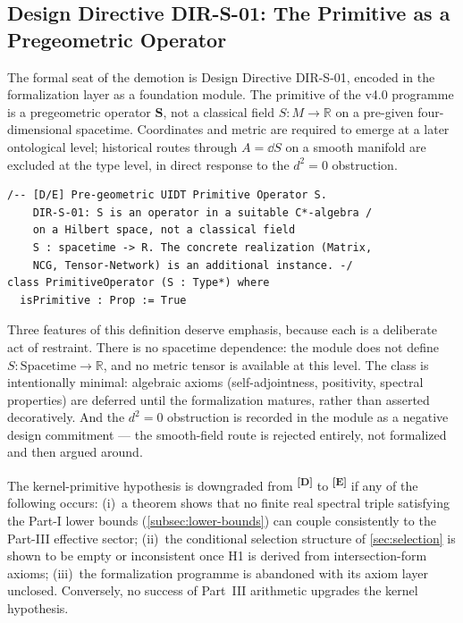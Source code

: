 \documentclass[12pt,a4paper,twoside]{article}
\theoremstyle{plain}
\theoremstyle{definition}
\theoremstyle{remark}
\newcommand{\catmark}[1]{\textsuperscript{\textsf{\textbf{[#1]}}}}
\begin{document}
\subsection{Design Directive DIR-S-01: The Primitive as a Pregeometric Operator}
\label{subsec:dir-s-01}

The formal seat of the demotion is Design Directive DIR-S-01, encoded in
the formalization layer as a foundation module. The primitive of the v4.0
programme is a pregeometric operator $\mathbf S$, not a classical field
$S \colon M \to \mathbb R$ on a pre-given four-dimensional spacetime.
Coordinates and metric are required to emerge at a later ontological
level; historical routes through $A = \dd S$ on a smooth manifold are excluded at
the type level, in direct response to the $d^2 = 0$ obstruction.

\begin{lstlisting}
/-- [D/E] Pre-geometric UIDT Primitive Operator S.
    DIR-S-01: S is an operator in a suitable C*-algebra /
    on a Hilbert space, not a classical field
    S : spacetime -> R. The concrete realization (Matrix,
    NCG, Tensor-Network) is an additional instance. -/
class PrimitiveOperator (S : Type*) where
  isPrimitive : Prop := True
\end{lstlisting}

Three features of this definition deserve emphasis, because each is a
deliberate act of restraint. There is no spacetime dependence: the module
does not define $S \colon \mathrm{Spacetime} \to \mathbb R$, and no metric
tensor is available at this level. The class is intentionally minimal:
algebraic axioms (self-adjointness, positivity, spectral properties) are
deferred until the formalization matures, rather than asserted
decoratively. And the $d^2=0$ obstruction is recorded in the module as a
negative design commitment --- the smooth-field route is rejected
entirely, not formalized and then argued around.

\begin{killswitch}
The kernel-primitive hypothesis is downgraded from \catmark{D} to
\catmark{E} if any of the following occurs: (i)~a theorem shows that no
finite real spectral triple satisfying the Part-I lower bounds
(\cref{subsec:lower-bounds}) can couple consistently to the Part-III
effective sector; (ii)~the conditional selection structure of
\cref{sec:selection} is shown to be empty or inconsistent once H1 is
derived from intersection-form axioms; (iii)~the formalization programme
is abandoned with its axiom layer unclosed. Conversely, no success of
Part~III arithmetic upgrades the kernel hypothesis.
\end{killswitch}
\end{document}
